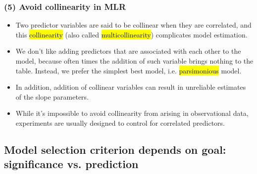 \documentclass[11pt,containsverbatim,handout,xcolor=xelatex,dvipsnames,table]{beamer}
\begin{document}
\begin{frame}
\frametitle{(5) Avoid collinearity in MLR}

\begin{itemize}

\item Two predictor variables are said to be collinear when they are correlated, and this \hl{collinearity} (also called \hl{multicollinearity}) complicates model estimation. \\

\pause

\item We don't like adding predictors that are associated with each other to the model, because often times the addition of such variable brings nothing to the table. Instead, we prefer the simplest best model, i.e. \hl{parsimonious} model.

\pause

\item In addition, addition of collinear variables can result in unreliable estimates of the slope parameters.

\pause

\item While it's impossible to avoid collinearity from arising in observational data, experiments are usually designed to control for correlated predictors.

\end{itemize}

\end{frame}


\subsection{Model selection criterion depends on goal: significance vs. prediction}
\label{mi6}

\end{document}
